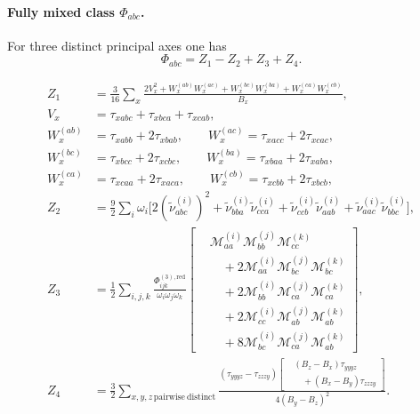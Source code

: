 \paragraph{Fully mixed class $\Phi_{abc}$.}
For three distinct principal axes one has
\begin{equation}
\Phi_{abc}=Z_1-Z_2+Z_3+Z_4.
\end{equation}

\begin{widetext}
\begin{equation}
\begin{aligned}
Z_1
&=
\frac{3}{16}\sum_x
\frac{
2V_x^2
+W_x^{(ab)}W_x^{(ac)}
+W_x^{(bc)}W_x^{(ba)}
+W_x^{(ca)}W_x^{(cb)}
}{B_x},
\\
V_x &= \tau_{xabc}+\tau_{xbca}+\tau_{xcab},
\\
W_x^{(ab)} &= \tau_{xabb}+2\tau_{xbab},
\qquad
W_x^{(ac)} = \tau_{xacc}+2\tau_{xcac},
\\
W_x^{(bc)} &= \tau_{xbcc}+2\tau_{xcbc},
\qquad
W_x^{(ba)} = \tau_{xbaa}+2\tau_{xaba},
\\
W_x^{(ca)} &= \tau_{xcaa}+2\tau_{xaca},
\qquad
W_x^{(cb)} = \tau_{xcbb}+2\tau_{xbcb},
\\[6pt]
Z_2
&=
\frac{9}{2}\sum_i\omega_i
\Big[
2\left(\widetilde{\nu}^{(i)}_{abc}\right)^2
+\widetilde{\nu}^{(i)}_{bba}\widetilde{\nu}^{(i)}_{cca}
+\widetilde{\nu}^{(i)}_{ccb}\widetilde{\nu}^{(i)}_{aab}
+\widetilde{\nu}^{(i)}_{aac}\widetilde{\nu}^{(i)}_{bbc}
\Big],
\\[6pt]
Z_3
&=
\frac{1}{2}\sum_{i,j,k}
\frac{\Phi^{(3),\mathrm{red}}_{ijk}}{\omega_i\omega_j\omega_k}
\left[
\begin{aligned}
&\mathcal{M}^{(i)}_{aa}\mathcal{M}^{(j)}_{bb}\mathcal{M}^{(k)}_{cc}
\\
&\quad
+2\mathcal{M}^{(i)}_{aa}\mathcal{M}^{(j)}_{bc}\mathcal{M}^{(k)}_{bc}
\\
&\quad
+2\mathcal{M}^{(i)}_{bb}\mathcal{M}^{(j)}_{ca}\mathcal{M}^{(k)}_{ca}
\\
&\quad
+2\mathcal{M}^{(i)}_{cc}\mathcal{M}^{(j)}_{ab}\mathcal{M}^{(k)}_{ab}
\\
&\quad
+8\mathcal{M}^{(i)}_{bc}\mathcal{M}^{(j)}_{ca}\mathcal{M}^{(k)}_{ab}
\end{aligned}
\right],
\\[6pt]
Z_4
&=
\frac{3}{2}
\sum_{x,y,z\,\mathrm{pairwise\ distinct}}
\frac{
(\tau_{yyyz}-\tau_{zzzy})
\left[
\begin{aligned}
&(B_z-B_x)\tau_{yyyz}
\\
&\quad +(B_x-B_y)\tau_{zzzy}
\end{aligned}
\right]
}{4(B_y-B_z)^2}.
\end{aligned}
\end{equation}
\end{widetext}

